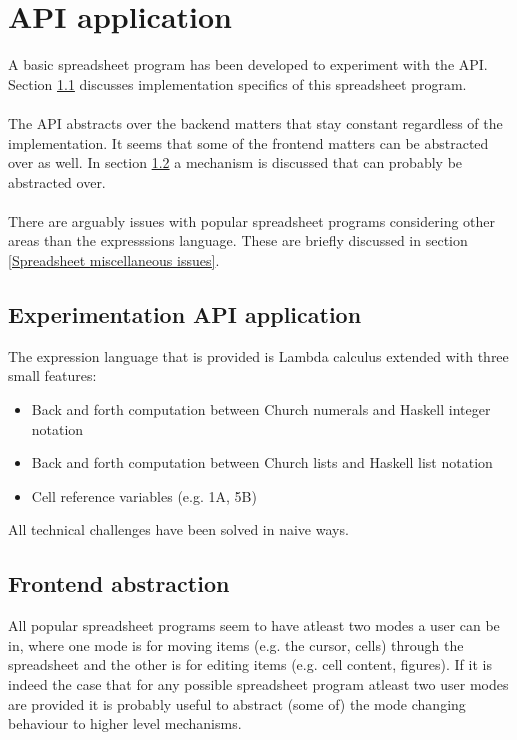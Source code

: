 \documentclass[10pt,a4paper]{article}
\begin{document}
\section{API application}
\label{API application}
A basic spreadsheet program has been developed to experiment with the API.
Section \ref{Experimentation API application} discusses implementation specifics of this
spreadsheet program.
\\\\
The API abstracts over the backend matters that stay constant regardless of the implementation.
It seems that some of the frontend matters can be abstracted over as well. In section
\ref{Frontend abstraction} a mechanism is discussed that can probably be abstracted over.
\\\\
There are arguably issues with popular spreadsheet programs considering other areas than the
expresssions language. These are briefly discussed in section \ref{Spreadsheet miscellaneous issues}.

\subsection{Experimentation API application}
\label{Experimentation API application}
The expression language that is provided is Lambda calculus extended with three small features:
\begin{itemize}
\item Back and forth computation between Church numerals and Haskell integer notation
\item Back and forth computation between Church lists and Haskell list notation
\item Cell reference variables (e.g. 1A, 5B)
\end{itemize}
All technical challenges have been solved in naive ways.

\subsection{Frontend abstraction}
\label{Frontend abstraction}
All popular spreadsheet programs seem to have atleast two modes a user can be in,
where one mode is for moving items (e.g. the cursor, cells) through the spreadsheet and the other
is for editing items (e.g. cell content, figures).
If it is indeed the case that for any possible spreadsheet program atleast two user modes are
provided it is probably useful to abstract (some of) the mode changing behaviour to higher level
mechanisms.
\end{document}
